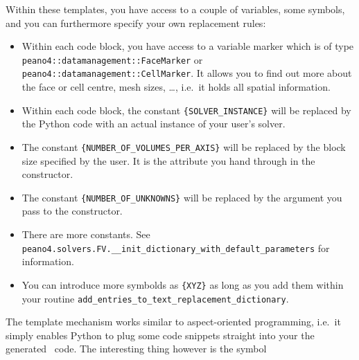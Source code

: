 Within these templates, you have access to a couple of variables, some symbols,
and you can furthermore specify your own replacement rules:
\begin{itemize}
  \item Within each code block, you have access to a variable marker which is of
  type \texttt{peano4::datamanagement::FaceMarker} or
  \texttt{peano4::datamanagement::CellMarker}. It allows you to find out more
  about the face or cell centre, mesh sizes, \ldots, i.e.~it holds all spatial
  information.
  \item Within each code block, the constant \texttt{\{SOLVER\_INSTANCE\}} will
  be replaced by the Python code with an actual instance of your user's solver.
  \item The constant
  \texttt{\{NUMBER\_OF\_VOLUMES\_PER\_AXIS\}} will be replaced by the block size
  specified by the user. It is the attribute you hand through in the
  constructor.
  \item The constant
  \texttt{\{NUMBER\_OF\_UNKNOWNS\}} will be replaced by the argument you pass to
  the constructor.
  \item There are more constants. See \linebreak
  \texttt{peano4.solvers.FV.\_\_init\_dictionary\_with\_default\_parameters} for
  information.
  \item You can introduce more symbolds as \texttt{\{XYZ\}} as long as you add
  them within your routine
  \texttt{add\_entries\_to\_text\_replacement\_dictionary}.
\end{itemize}


\noindent
The template mechanism works similar to aspect-oriented programming, i.e.~it
simply enables Python to plug some code snippets straight into your the
generated \ExaHyPE\ code. 
The interesting thing however is the symbol

